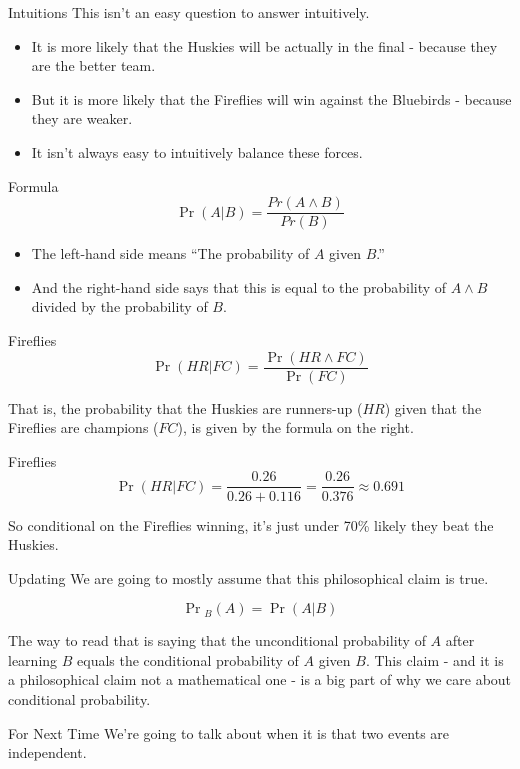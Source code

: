 \documentclass[
  ignorenonframetext,
]{beamer}
\providecommand{\tightlist}{%
  \setlength{\itemsep}{0pt}\setlength{\parskip}{0pt}}
\renewcommand{\,}{\text{, }}
\begin{document}
\begin{frame}{Intuitions}
\protect\hypertarget{intuitions}{}
This isn't an easy question to answer intuitively.

\begin{itemize}
\tightlist
\item
  It is more likely that the Huskies will be actually in the final -
  because they are the better team.
\item
  But it is more likely that the Fireflies will win against the
  Bluebirds - because they are weaker.
\item
  It isn't always easy to intuitively balance these forces.
\end{itemize}
\end{frame}

\begin{frame}{Formula}
\protect\hypertarget{formula}{}
\[
\Pr(A | B) = \frac{Pr(A \wedge B)}{Pr(B)}
\]

\pause

\begin{itemize}
\tightlist
\item
  The left-hand side means ``The probability of \(A\) given \(B\).''
  \pause
\item
  And the right-hand side says that this is equal to the probability of
  \(A \wedge B\) divided by the probability of \(B\).
\end{itemize}
\end{frame}

\begin{frame}{Fireflies}
\protect\hypertarget{fireflies}{}
\[
\Pr(HR | FC) = \frac{\Pr(HR \wedge FC)}{\Pr(FC)}
\]

That is, the probability that the Huskies are runners-up (\(HR\)) given
that the Fireflies are champions (\(FC\)), is given by the formula on
the right.
\end{frame}

\begin{frame}{Fireflies}
\protect\hypertarget{fireflies-1}{}
\[
\Pr(HR | FC) = \frac{0.26}{0.26+0.116} = \frac{0.26}{0.376} \approx 0.691
\]

So conditional on the Fireflies winning, it's just under 70\% likely
they beat the Huskies.
\end{frame}

\begin{frame}{Updating}
\protect\hypertarget{updating}{}
We are going to mostly assume that this philosophical claim is true.

\[
\Pr{}_B(A) = \Pr(A | B)
\]

The way to read that is saying that the unconditional probability of
\(A\) after learning \(B\) equals the conditional probability of \(A\)
given \(B\). This claim - and it is a philosophical claim not a
mathematical one - is a big part of why we care about conditional
probability.
\end{frame}

\begin{frame}{For Next Time}
\protect\hypertarget{for-next-time}{}
We're going to talk about when it is that two events are independent.
\end{frame}
\end{document}
